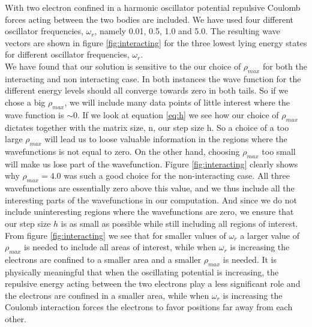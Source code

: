 \documentclass[12pt]{article}
\numberwithin{figure}{section}
\numberwithin{table}{section}
\begin{document}
\noindent With two electron confined in a harmonic oscillator potential repulsive Coulomb forces acting between the two bodies are included. We have used four different oscillator frequencies, $\omega_r$, namely 0.01, 0.5, 1.0 and 5.0. The resulting wave vectors are shown in figure \ref{fig:interacting} for the three lowest lying energy states for different oscillator frequencies, $\omega_r$. \\  


\noindent We have found that our solution is sensitive to the our choice of $\rho_{max}$ for both the interacting and non interacting case. In both instances the wave function for the different energy levels should all converge towards zero in both tails. So if we chose a big $\rho_{max}$, we will include many data points of little interest where the wave function is $\sim 0$. If we look at equation \eqref{eq:h} we see how our choice of $\rho_{max}$ dictates together with the matrix size, n, our step size h. So a choice of a too large $\rho_{max}$ will lead us to loose valuable information in the regions where the wavefunctions is not equal to zero. On the other hand, choosing $\rho_{max}$ too small will make us lose part of the wavefunction. Figure \ref{fig:interacting} clearly shows why $\rho_{max}=4.0$ was such a good choice for the non-interacting case. All three wavefunctions are essentially zero above this value, and we thus include all the interesting parts of the wavefunctions in our computation. And since we do not include uninteresting regions where the wavefunctions are zero, we ensure that our step size $h$ is as small as possible while still including all regions of interest. \\

\noindent From figure \ref{fig:interacting} we see that for smaller values of $\omega_r$ a larger value of $\rho_{max}$ is needed to include all areas of interest, while when $\omega_r$ is increasing the electrons are confined to a smaller area and a smaller $\rho_{max}$ is needed. It is physically meaningful that when the oscillating potential is increasing, the repulsive energy acting between the two electrons play a less significant role and the electrons are confined in a smaller area, while when $\omega_r$ is increasing the Coulomb interaction forces the electrons to favor positions far away from each other.  \\
\end{document}

